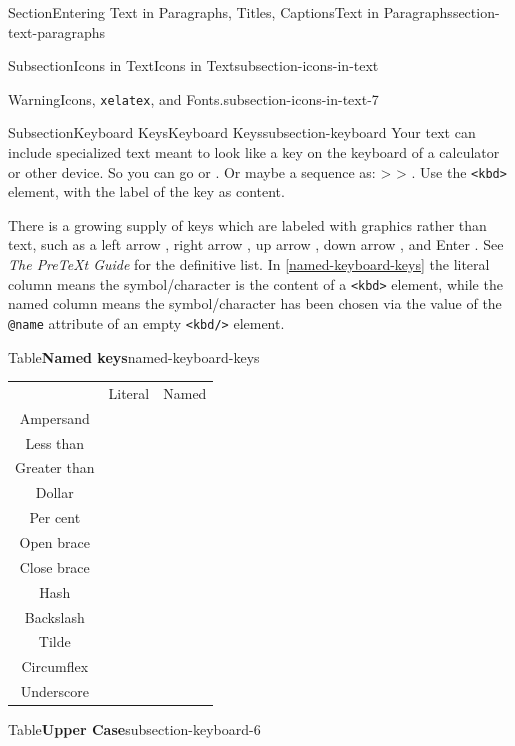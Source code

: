 \documentclass[twoside,10pt,]{article}
\newcommand{\tabularfont}{\relax}
\newcommand{\xreffont}{\relax}
\newcommand{\mono}[1]{\texttt{#1}}
\newcommand{\pubtitle}[1]{\textsl{#1}}
\numberwithin{equation}{section}
\newcommand{\kbd}[1]{\keys{{#1}}}
\begin{document}
\begin{sectionptx}{Section}{Entering Text in Paragraphs, Titles, Captions}{}{Text in Paragraphs}{}{}{section-text-paragraphs}
\begin{subsectionptx}{Subsection}{Icons in Text}{}{Icons in Text}{}{}{subsection-icons-in-text}
\begin{warning}{Warning}{Icons, \mono{xelatex}, and Fonts.}{subsection-icons-in-text-7}
\end{warning}
\end{subsectionptx}
%
%
\typeout{************************************************}
\typeout{************************************************}
%
\begin{subsectionptx}{Subsection}{Keyboard Keys}{}{Keyboard Keys}{}{}{subsection-keyboard}
%
Your text can include specialized text meant to look like a key on the keyboard of a calculator or other device.  So you can go \kbd{b} \kbd{Enter} \kbd{<} or \kbd{F1}.  Or maybe a sequence as: \kbd{Tab} \textgreater{} \kbd{Ctrl} \textgreater{} \kbd{T}.  Use the \mono{<kbd>} element, with the label of the key as content.%
\par
There is a growing supply of keys which are labeled with graphics rather than text, such as a left arrow \kbd{\arrowkeyleft}, right arrow \kbd{\arrowkeyright}, up arrow \kbd{\arrowkeyup}, down arrow \kbd{\arrowkeydown}, and Enter \kbd{\return}.  See \pubtitle{The PreTeXt Guide} for the definitive list.  In \hyperref[named-keyboard-keys]{{\xreffont\ref{named-keyboard-keys}}} the literal column means the symbol\slash{}character is the content of a \mono{<kbd>} element, while the named column means the symbol\slash{}character has been chosen via the value of the \mono{@name} attribute of an empty \mono{<kbd/>} element.%
\begin{tableptx}{Table}{\textbf{Named keys}}{named-keyboard-keys}{}%
\centering%
{\tabularfont%
\begin{tabular}{ccc}
&Literal&Named\tabularnewline[0pt]
Ampersand&\kbd{\&}&\kbd{\&}\tabularnewline[0pt]
Less than&\kbd{<}&\kbd{\textless}\tabularnewline[0pt]
Greater than&\kbd{>}&\kbd{\textgreater}\tabularnewline[0pt]
Dollar&\kbd{\$}&\kbd{\$}\tabularnewline[0pt]
Per cent&\kbd{\%}&\kbd{\%}\tabularnewline[0pt]
Open brace&\kbd{\{}&\kbd{\textbraceleft}\tabularnewline[0pt]
Close brace&\kbd{\}}&\kbd{\textbraceright}\tabularnewline[0pt]
Hash&\kbd{\#}&\kbd{\#}\tabularnewline[0pt]
Backslash&\kbd{\textbackslash{}}&\kbd{\textbackslash}\tabularnewline[0pt]
Tilde&\kbd{\textasciitilde{}}&\kbd{\textasciitilde}\tabularnewline[0pt]
Circumflex&\kbd{\textasciicircum{}}&\kbd{\textasciicircum}\tabularnewline[0pt]
Underscore&\kbd{\_}&\kbd{\textunderscore}
\end{tabular}
}%
\end{tableptx}%
\begin{tableptx}{Table}{\textbf{Upper Case}}{subsection-keyboard-6}{}%
\centering%
{\tabularfont%
\begin{tabular}{cccccccccccccc}

\end{tabular}}
\end{tableptx}
\end{subsectionptx}
\end{sectionptx}
\end{document}
